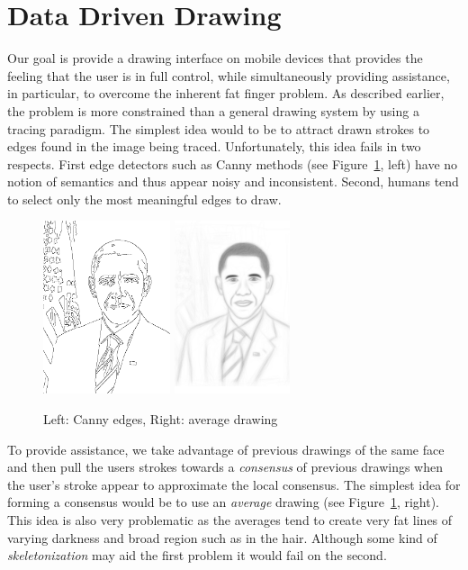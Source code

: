 \section{Data Driven Drawing}

Our goal is provide a drawing interface on mobile devices that provides the feeling that the user is in full control, while simultaneously providing assistance, in particular, to overcome the inherent fat finger problem. As described earlier, the problem is more constrained than a general drawing system by using a tracing paradigm. The simplest idea would to be to attract drawn strokes to edges found in the image being traced. Unfortunately, this idea fails in two respects. First edge detectors such as Canny methods (see Figure~\ref{fig:edges}, left) have no notion of semantics and thus appear noisy and inconsistent. Second, humans tend to select only the most meaningful edges to draw.

\begin{figure}
  \centering%
\includegraphics[height=2in]{figures/imagetable/edges_bo.png}
\hspace{0.1in}
\includegraphics[height=2in]{figures/imagetable/avg_bo.png}
  \caption{Left: Canny edges, Right: average drawing}
  \label{fig:edges}
\end{figure}

To provide assistance, we take advantage of previous drawings of the same face and then pull the users strokes towards a {\em consensus} of previous drawings when the user's stroke appear to approximate the local consensus. The simplest idea for forming a consensus would be to use an {\em average} drawing (see Figure~\ref{fig:edges}, right). This idea is also very problematic as the averages tend to create very fat lines of varying darkness and broad region such as in the hair. Although some kind of {\em skeletonization} may aid the first problem it would fail on the second.

